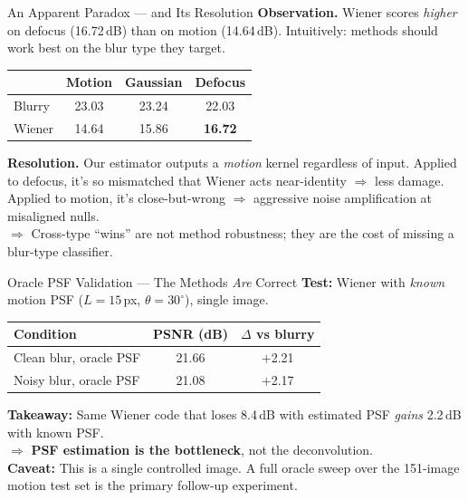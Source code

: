 \documentclass[aspectratio=169,11pt]{beamer}
\providecommand{\degree}{^{\circ}}
\begin{document}
\begin{frame}{An Apparent Paradox --- and Its Resolution}
\textbf{Observation.} Wiener scores \textit{higher} on defocus (16.72\,dB) than on motion (14.64\,dB).
Intuitively: methods should work best on the blur type they target. \\[0.2cm]

\begin{tabular}{lccc}
\toprule
 & \textbf{Motion} & \textbf{Gaussian} & \textbf{Defocus} \\
\midrule
Blurry       & 23.03 & 23.24 & 22.03 \\
Wiener       & 14.64 & 15.86 & \textbf{16.72} \\
\bottomrule
\end{tabular}

\vspace{0.3cm}
\textbf{Resolution.} Our estimator outputs a \textit{motion} kernel regardless of input.
Applied to defocus, it's so mismatched that Wiener acts near-identity $\Rightarrow$ less damage.
Applied to motion, it's close-but-wrong $\Rightarrow$ aggressive noise amplification at misaligned nulls. \\[0.2cm]

\small $\Rightarrow$ Cross-type ``wins'' are not method robustness; they are the cost of missing a blur-type classifier.
\end{frame}

\begin{frame}{Oracle PSF Validation --- The Methods \textit{Are} Correct}
\textbf{Test:} Wiener with \textit{known} motion PSF ($L=15$\,px, $\theta=30\degree$), single image.

\vspace{0.2cm}
\begin{tabular}{lcc}
\toprule
\textbf{Condition} & \textbf{PSNR (dB)} & \textbf{$\Delta$ vs blurry} \\
\midrule
Clean blur, oracle PSF & 21.66 & $+$2.21 \\
Noisy blur, oracle PSF & 21.08 & $+$2.17 \\
\bottomrule
\end{tabular}

\vspace{0.3cm}
\textbf{Takeaway:} Same Wiener code that loses 8.4\,dB with estimated PSF
\textit{gains} 2.2\,dB with known PSF. \\
$\Rightarrow$ \textbf{PSF estimation is the bottleneck}, not the deconvolution. \\[0.2cm]

\textbf{Caveat:} This is a single controlled image. A full oracle sweep over
the 151-image motion test set is the primary follow-up experiment.
\end{frame}
\end{document}
